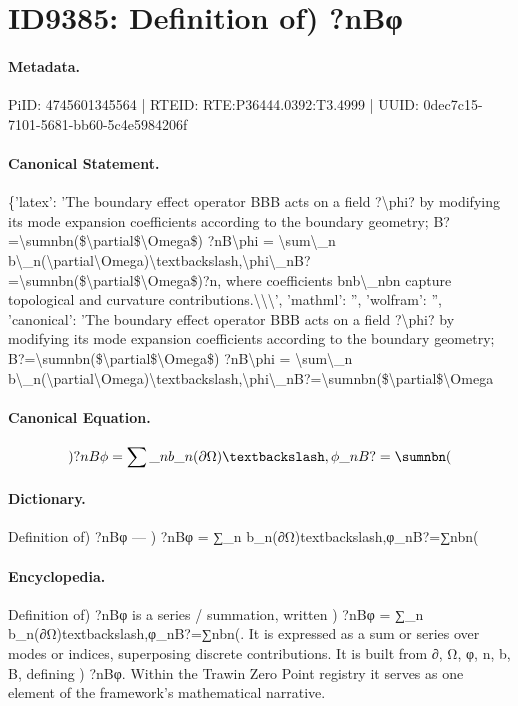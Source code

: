 \section*{ID9385: Definition of) ?nBφ}
\paragraph{Metadata.}
PiID: 4745601345564 | RTEID: RTE:P36444.0392:T3.4999 | UUID: 0dec7c15-7101-5681-bb60-5c4e5984206f

\paragraph{Canonical Statement.}
\{'latex': 'The boundary effect operator BBB acts on a field ?\textbackslash{}phi? by modifying its mode expansion coefficients according to the boundary geometry; B?=\textbackslash{}sumnbn(\$\textbackslash{}partial\$\textbackslash{}Omega\$) ?nB\textbackslash{}phi = \textbackslash{}sum\textbackslash{}\_n b\textbackslash{}\_n(\textbackslash{}partial\textbackslash{}Omega)\textbackslash{}textbackslash,\textbackslash{}phi\textbackslash{}\_nB?=\textbackslash{}sumnbn(\$\textbackslash{}partial\$\textbackslash{}Omega\$)?n, where coefficients bnb\textbackslash{}\_nbn capture topological and curvature contributions.\textbackslash{}\textbackslash{}\textbackslash{}', 'mathml': '', 'wolfram': '', 'canonical': 'The boundary effect operator BBB acts on a field ?\textbackslash{}phi? by modifying its mode expansion coefficients according to the boundary geometry; B?=\textbackslash{}sumnbn(\$\textbackslash{}partial\$\textbackslash{}Omega\$) ?nB\textbackslash{}phi = \textbackslash{}sum\textbackslash{}\_n b\textbackslash{}\_n(\textbackslash{}partial\textbackslash{}Omega)\textbackslash{}textbackslash,\textbackslash{}phi\textbackslash{}\_nB?=\textbackslash{}sumnbn(\$\textbackslash{}partial\$\textbackslash{}Omega

\paragraph{Canonical Equation.}
\[
) ?nB\phi = \sum\_n b\_n(\partial\Omega)\textbackslash,\phi\_nB?=\sumnbn(
\]

\paragraph{Dictionary.}
Definition of) ?nBφ — ) ?nBφ = ∑\_n b\_n(∂Ω)textbackslash,φ\_nB?=∑nbn(

\paragraph{Encyclopedia.}
Definition of) ?nBφ is a series / summation, written ) ?nBφ = ∑\_n b\_n(∂Ω)textbackslash,φ\_nB?=∑nbn(. It is expressed as a sum or series over modes or indices, superposing discrete contributions. It is built from ∂, Ω, φ, n, b, B, defining ) ?nBφ. Within the Trawin Zero Point registry it serves as one element of the framework's mathematical narrative.
